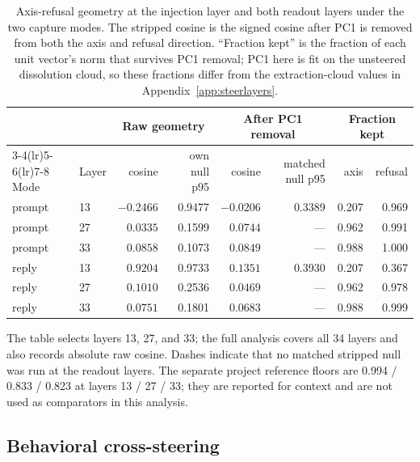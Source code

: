 \begin{table}[!ht]
  \caption{Axis-refusal geometry at the injection layer and both readout
  layers under the two capture modes. The stripped cosine is the signed cosine
  after PC1 is removed from both the axis and refusal direction. ``Fraction
  kept'' is the fraction of each unit vector's norm that survives PC1 removal;
  PC1 here is fit on the unsteered dissolution cloud, so these fractions
  differ from the extraction-cloud values in Appendix~\ref{app:steerlayers}.}
  \label{tab:refusalgeom}
  \centering
  \scriptsize
  \setlength{\tabcolsep}{4pt}
  \begin{tabular}{llrrrrrr}
    \toprule
    & & \multicolumn{2}{c}{Raw geometry} & \multicolumn{2}{c}{After PC1 removal} & \multicolumn{2}{c}{Fraction kept} \\
    \cmidrule(lr){3-4}\cmidrule(lr){5-6}\cmidrule(lr){7-8}
    Mode & Layer & cosine & own null p95 & cosine & matched null p95 & axis & refusal \\
    \midrule
    prompt & 13 & $-0.2466$ & 0.9477 & $-0.0206$ & 0.3389 & 0.207 & 0.969 \\
    prompt & 27 & $0.0335$  & 0.1599 & $0.0744$  & ---    & 0.962 & 0.991 \\
    prompt & 33 & $0.0858$  & 0.1073 & $0.0849$  & ---    & 0.988 & 1.000 \\
    \midrule
    reply  & 13 & $0.9204$  & 0.9733 & $0.1351$  & 0.3930 & 0.207 & 0.367 \\
    reply  & 27 & $0.1010$  & 0.2536 & $0.0469$  & ---    & 0.962 & 0.978 \\
    reply  & 33 & $0.0751$  & 0.1801 & $0.0683$  & ---    & 0.988 & 0.999 \\
    \bottomrule
  \end{tabular}
  \par\smallskip
  \begin{minipage}{\linewidth}\scriptsize
  The table selects layers 13, 27, and 33; the full analysis covers all 34
  layers and also records absolute raw cosine. Dashes indicate that
  no matched stripped null was run at the readout layers. The separate project
  reference floors are 0.994 / 0.833 / 0.823 at layers 13 / 27 / 33; they are
  reported for context and are not used as comparators in this analysis.
  \end{minipage}
\end{table}

\FloatBarrier

\subsection{Behavioral cross-steering}

